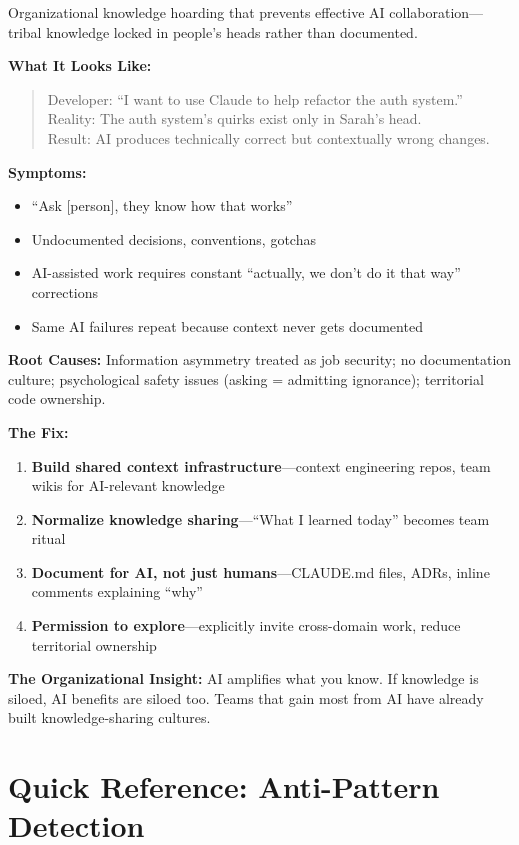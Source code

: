 Organizational knowledge hoarding that prevents effective AI collaboration---tribal knowledge locked in people's heads rather than documented.

\textbf{What It Looks Like:}

\begin{quote}
Developer: ``I want to use Claude to help refactor the auth system.''\\
Reality: The auth system's quirks exist only in Sarah's head.\\
Result: AI produces technically correct but contextually wrong changes.
\end{quote}

\textbf{Symptoms:}
\begin{itemize}
    \item ``Ask [person], they know how that works''
    \item Undocumented decisions, conventions, gotchas
    \item AI-assisted work requires constant ``actually, we don't do it that way'' corrections
    \item Same AI failures repeat because context never gets documented
\end{itemize}

\textbf{Root Causes:} Information asymmetry treated as job security; no documentation culture; psychological safety issues (asking = admitting ignorance); territorial code ownership.

\textbf{The Fix:}
\begin{enumerate}
    \item \textbf{Build shared context infrastructure}---context engineering repos, team wikis for AI-relevant knowledge
    \item \textbf{Normalize knowledge sharing}---``What I learned today'' becomes team ritual
    \item \textbf{Document for AI, not just humans}---CLAUDE.md files, ADRs, inline comments explaining ``why''
    \item \textbf{Permission to explore}---explicitly invite cross-domain work, reduce territorial ownership
\end{enumerate}

\textbf{The Organizational Insight:} AI amplifies what you know. If knowledge is siloed, AI benefits are siloed too. Teams that gain most from AI have already built knowledge-sharing cultures.

\section{Quick Reference: Anti-Pattern Detection}

